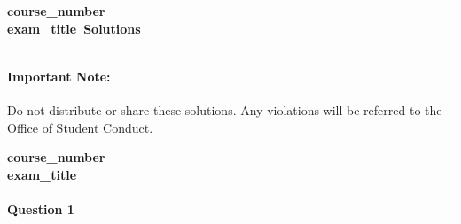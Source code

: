 \documentclass[11pt]{article}
\newif\ifsolutions
\newcommand{\coursenumber}{ {{course_number}}}
\newcommand{\examtitle}{{{exam_title}}}
\begin{document}
\thispagestyle{empty}
\ifsolutions
\begin{center}
\Large\bf\coursenumber\\[2pt] \examtitle ~Solutions \\ \large\docdate
\end{center}

\hrule
\paragraph{Important Note:} Do not distribute or share these solutions. Any violations will be referred to the Office of Student Conduct.
\else 
\begin{center}
\Large\bf\coursenumber\\[2pt] \examtitle \\
\end{center}

\paragraph{Question 1}
\end{document}
